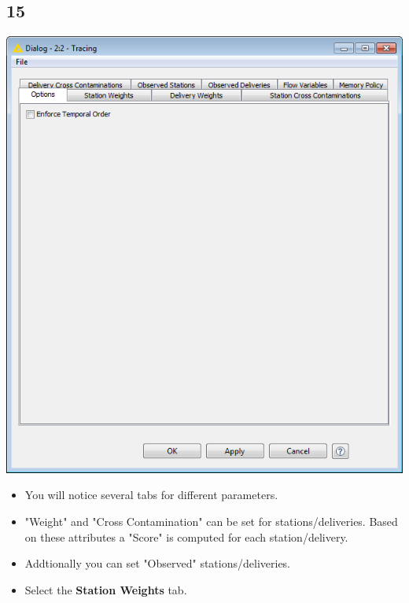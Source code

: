 \documentclass{beamer}
\begin{document}
\subsection{15}
\begin{frame}
	\begin{center}
  		\includegraphics[height=0.6\textheight]{15.png}
	\end{center}
	\begin{itemize}
		\item You will notice several tabs for different parameters.
		\item "Weight" and "Cross Contamination" can be set for stations/deliveries. Based on these attributes a "Score" is computed for each station/delivery.
		\item Addtionally you can set "Observed" stations/deliveries.
		\item Select the \textbf{Station Weights} tab.
	\end{itemize}
\end{frame}
\end{document}
